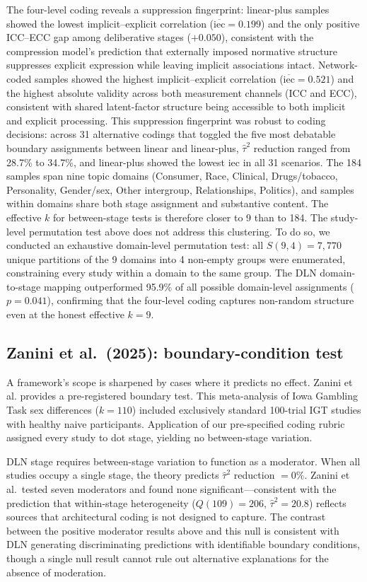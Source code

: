 \documentclass[11pt]{article}
\begin{document}
The four-level coding reveals a suppression fingerprint: linear-plus
samples showed the lowest implicit--explicit correlation
($\overline{\mathrm{iec}} = 0.199$) and the only positive ICC--ECC gap
among deliberative stages ($+0.050$), consistent with the compression
model's prediction that externally imposed normative structure
suppresses explicit expression while leaving implicit associations
intact\cite{Wu2026}. Network-coded samples showed the highest
implicit--explicit correlation ($\overline{\mathrm{iec}} = 0.521$) and
the highest absolute validity across both measurement channels (ICC and
ECC), consistent with shared latent-factor structure being accessible
to both implicit and explicit processing.
This suppression fingerprint was robust to coding decisions: across 31
alternative codings that toggled the five most debatable boundary
assignments between linear and linear-plus, $\hat\tau^2$ reduction
ranged from 28.7\% to 34.7\%, and linear-plus showed the lowest iec in
all 31 scenarios.
The 184 samples span nine topic domains (Consumer, Race, Clinical,
Drugs/tobacco, Personality, Gender/sex, Other intergroup,
Relationships, Politics), and samples within domains share both
stage assignment and substantive content. The effective $k$ for
between-stage tests is therefore closer to 9 than to 184.
The study-level permutation test above does not address this
clustering. To do so, we conducted an exhaustive domain-level
permutation test: all $S(9,4) = 7{,}770$ unique partitions of the
9 domains into 4 non-empty groups were enumerated, constraining
every study within a domain to the same group. The DLN
domain-to-stage mapping outperformed 95.9\% of all possible
domain-level assignments ($p = 0.041$), confirming that the
four-level coding captures non-random structure even at the honest
effective $k = 9$.


\subsection{Zanini et al.\ (2025): boundary-condition test}

A framework's scope is sharpened by cases where it predicts no effect.
Zanini et al.\cite{Zanini2025} provides a pre-registered boundary test. This
meta-analysis of Iowa Gambling Task sex differences ($k = 110$) included
exclusively standard 100-trial IGT studies with healthy naive
participants. Application of our pre-specified coding rubric assigned
every study to dot stage, yielding no between-stage variation.

DLN stage requires between-stage variation to function as a moderator.
When all studies occupy a single stage, the theory predicts
$\hat\tau^2$ reduction $= 0\%$. Zanini et al.\ tested seven moderators
and found none significant---consistent with the prediction that
within-stage heterogeneity ($Q(109) = 206$, $\hat\tau^2 = 20.8$)
reflects sources that architectural coding is not designed to capture.
The contrast between the positive moderator results above and this
null is consistent with DLN generating discriminating predictions with
identifiable boundary conditions, though a single null result
cannot rule out alternative explanations for the absence of moderation.
\end{document}
